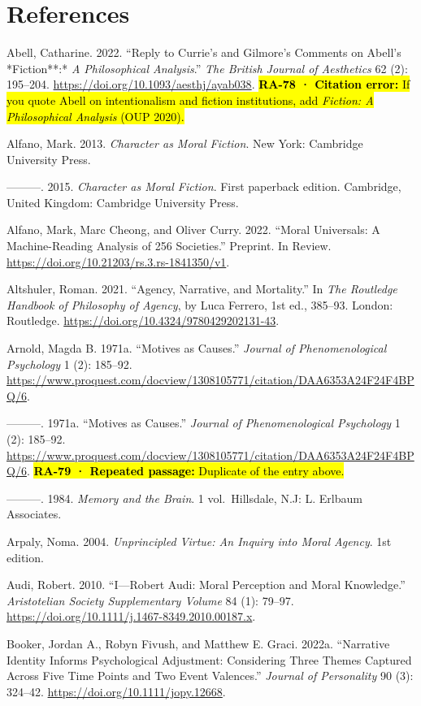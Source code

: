 \documentclass[
  letterpaper,
  DIV=11,
  numbers=noendperiod]{scrartcl}
\theoremstyle{remark}
\begin{document}
\section*{References}\label{references}

Abell, Catharine. 2022. ``Reply to Currie's and Gilmore's Comments on
Abell's *Fiction**:* \emph{A Philosophical Analysis}.'' \emph{The
British Journal of Aesthetics} 62 (2): 195--204.
\url{https://doi.org/10.1093/aesthj/ayab038}. \hl{\textbf{RA-78 ·
Citation error:} If you quote Abell on intentionalism and fiction
institutions, add \emph{Fiction: A Philosophical Analysis} (OUP 2020).}

Alfano, Mark. 2013. \emph{Character as Moral Fiction}. New York:
Cambridge University Press.

---------. 2015. \emph{Character as Moral Fiction}. First paperback
edition. Cambridge, United Kingdom: Cambridge University Press.

Alfano, Mark, Marc Cheong, and Oliver Curry. 2022. ``Moral Universals: A
Machine-Reading Analysis of 256 Societies.'' Preprint. In Review.
\url{https://doi.org/10.21203/rs.3.rs-1841350/v1}.

Altshuler, Roman. 2021. ``Agency, Narrative, and Mortality.'' In
\emph{The Routledge Handbook of Philosophy of Agency}, by Luca Ferrero,
1st ed., 385--93. London: Routledge.
\url{https://doi.org/10.4324/9780429202131-43}.

Arnold, Magda B. 1971a. ``Motives as Causes.'' \emph{Journal of
Phenomenological Psychology} 1 (2): 185--92.
\url{https://www.proquest.com/docview/1308105771/citation/DAA6353A24F24F4BPQ/6}.

---------. 1971a. ``Motives as Causes.'' \emph{Journal of
Phenomenological Psychology} 1 (2): 185--92.
\url{https://www.proquest.com/docview/1308105771/citation/DAA6353A24F24F4BPQ/6}.
\hl{\textbf{RA-79 · Repeated passage:} Duplicate of the entry above.}

---------. 1984. \emph{Memory and the Brain}. 1 vol.~Hillsdale, N.J: L.
Erlbaum Associates.

Arpaly, Noma. 2004. \emph{Unprincipled Virtue: An Inquiry into Moral
Agency}. 1st edition.

Audi, Robert. 2010. ``I---Robert Audi: Moral Perception and Moral
Knowledge.'' \emph{Aristotelian Society Supplementary Volume} 84 (1):
79--97. \url{https://doi.org/10.1111/j.1467-8349.2010.00187.x}.

Booker, Jordan A., Robyn Fivush, and Matthew E. Graci. 2022a.
``Narrative Identity Informs Psychological Adjustment: Considering Three
Themes Captured Across Five Time Points and Two Event Valences.''
\emph{Journal of Personality} 90 (3): 324--42.
\url{https://doi.org/10.1111/jopy.12668}.
\end{document}
